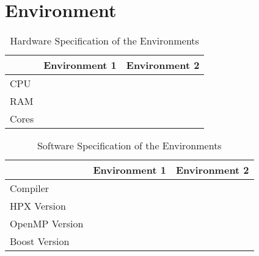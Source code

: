 \section{Environment}
\begin{table}
\centering
\caption{Hardware Specification of the Environments}
\begin{tabular}[h]{l c c}
 & Environment 1 & Environment 2 \\\hline
CPU &  &  \\
RAM &  &  \\
Cores &  &  \\\hline
\end{tabular}
\label{tab:hardEnv}
\end{table}

\begin{table}
\centering
\caption{Software Specification of the Environments}
\begin{tabular}[h]{l c c}
\centering
 & Environment 1 & Environment 2 \\\hline
Compiler &  &  \\
HPX Version &  &  \\
OpenMP Version &  &  \\
Boost Version &  &  \\\hline
\end{tabular}
\label{tab:softEnv}
\end{table}